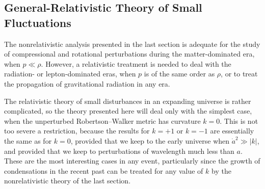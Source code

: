 
\subsection{General-Relativistic Theory of Small Fluctuations}\label{sec:15.10}

The nonrelativistic analysis presented in the last section is adequate for the
study of compressional and rotational perturbations during the matter-dominated
era, when \(p\ll\rho\). However, a relativistic treatment is needed to deal
with the radiation- or lepton-dominated eras, when \(p\) is of the same order
as \(\rho\), or to treat the propagation of gravitational radiation in any
era.

The relativistic theory of small disturbances in an expanding universe is
rather complicated, so the theory presented here will deal only with the
simplest case, when the unperturbed Robertson--Walker metric has curvature
\(k=0\). This is not too severe a restriction, because the results for
\(k=+1\) or \(k=-1\) are essentially the same as for \(k=0\), provided that
we keep to the early universe when \(\dot a^2\gg\lvert k\rvert\), and
provided that we keep to perturbations of wavelength much less than \(a\).
These are the most interesting cases in any event, particularly since the
growth of condensations in the recent past can be treated for any value of
\(k\) by the nonrelativistic theory of the last section.

